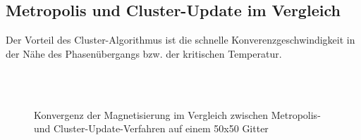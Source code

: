 \subsection{Metropolis und Cluster-Update im Vergleich}
Der Vorteil des Cluster-Algorithmus ist die schnelle Konverenzgeschwindigkeit in der Nähe des Phasenübergangs bzw. der kritischen Temperatur.\\\\

\begin{figure}[H]
	\centering
	\\
	\caption{Konvergenz der Magnetisierung im Vergleich zwischen Metropolis- und Cluster-Update-Verfahren auf einem 50x50 Gitter}
	\label{cu2d2steps}
\end{figure}

